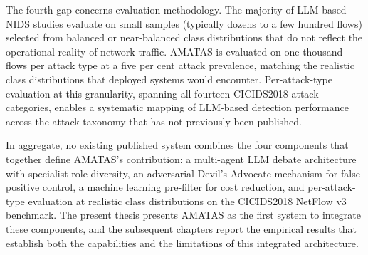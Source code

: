 \documentclass[../main.tex]{subfiles}
\begin{document}
The fourth gap concerns evaluation methodology. The majority of LLM-based NIDS studies evaluate on small samples (typically dozens to a few hundred flows) selected from balanced or near-balanced class distributions that do not reflect the operational reality of network traffic. AMATAS is evaluated on one thousand flows per attack type at a five per cent attack prevalence, matching the realistic class distributions that deployed systems would encounter. Per-attack-type evaluation at this granularity, spanning all fourteen CICIDS2018 attack categories, enables a systematic mapping of LLM-based detection performance across the attack taxonomy that has not previously been published.

In aggregate, no existing published system combines the four components that together define AMATAS's contribution: a multi-agent LLM debate architecture with specialist role diversity, an adversarial Devil's Advocate mechanism for false positive control, a machine learning pre-filter for cost reduction, and per-attack-type evaluation at realistic class distributions on the CICIDS2018 NetFlow v3 benchmark. The present thesis presents AMATAS as the first system to integrate these components, and the subsequent chapters report the empirical results that establish both the capabilities and the limitations of this integrated architecture.

\onlystandalone{\printbibliography}
\end{document}
